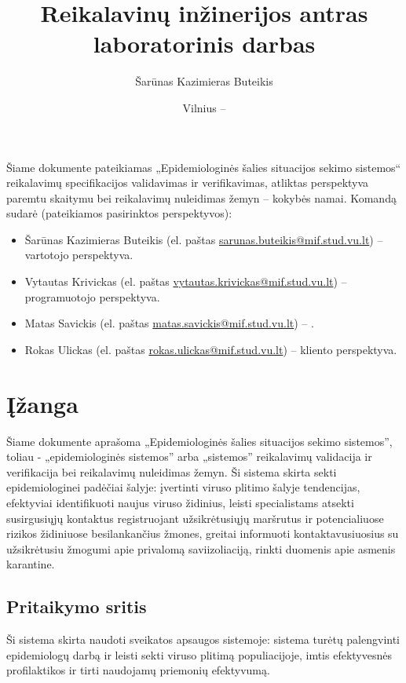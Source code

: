 \documentclass{VUMIFPSkursinis}
\title{Reikalavinų inžinerijos antras laboratorinis darbas}
\author{Šarūnas Kazimieras Buteikis}
\date{Vilnius – \the\year}
\begin{document}
\maketitle


Šiame dokumente pateikiamas „Epidemiologinės šalies situacijos sekimo sistemos“ reikalavimų specifikacijos validavimas ir verifikavimas, atliktas
perspektyva paremtu skaitymu bei reikalavimų nuleidimas žemyn -- kokybės namai. Komandą sudarė (pateikiamos pasirinktos perspektyvos):
\begin{itemize}
	\item Šarūnas Kazimieras Buteikis (el. paštas \href{mailto:sarunas.buteikis@mif.stud.vu.lt}{sarunas.buteikis@mif.stud.vu.lt}) -- vartotojo perspektyva.
	\item Vytautas Krivickas (el. paštas \href{mailto:vytautas.krivickas@mif.stud.vu.lt}{vytautas.krivickas@mif.stud.vu.lt}) -- programuotojo perspektyva.
	\item Matas Savickis (el. paštas \href{mailto:matas.savickis@mif.stud.vu.lt}{matas.savickis@mif.stud.vu.lt}) -- .
	\item Rokas Ulickas (el. paštas \href{mailto:rokas.ulickas@mif.stud.vu.lt}{rokas.ulickas@mif.stud.vu.lt}) -- kliento perspektyva.
\end{itemize}

\newpage

\tableofcontents


\section{Įžanga}

Šiame dokumente aprašoma „Epidemiologinės šalies situacijos sekimo sistemos”, toliau - „epidemiologinės sistemos” arba „sistemos”
reikalavimų validacija ir verifikacija bei reikalavimų nuleidimas žemyn.
Ši sistema skirta sekti epidemiologinei padėčiai šalyje: įvertinti viruso plitimo šalyje tendencijas,
efektyviai identifikuoti naujus viruso židinius, leisti specialistams atsekti susirgusiųjų
kontaktus registruojant užsikrėtusiųjų maršrutus ir potencialiuose rizikos židiniuose
besilankančius žmones, greitai informuoti kontaktavusiuosius su užsikrėtusiu žmogumi
apie privalomą saviizoliaciją, rinkti duomenis apie asmenis karantine.

\subsection{Pritaikymo sritis}
Ši sistema skirta naudoti sveikatos apsaugos sistemoje: sistema turėtų palengvinti
epidemiologų darbą ir leisti sekti viruso plitimą populiacijoje, imtis efektyvesnės
profilaktikos ir tirti naudojamų priemonių efektyvumą.
\end{document}
